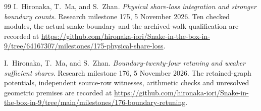 \documentclass[11pt,a4paper]{article}
\theoremstyle{definition}
\theoremstyle{remark}
\begin{document}
\begin{thebibliography}{99}
I.~Hironaka, T.~Ma, and S.~Zhan. \emph{Physical share-loss integration and stronger boundary counts}. Research milestone 175, 5 November 2026. Ten checked modules, the actual-snake boundary and the archived-walk qualification are recorded at
\url{https://github.com/hironaka-iori/Snake-in-the-box-in-9/tree/64167307/milestones/175-physical-share-loss}.

I.~Hironaka, T.~Ma, and S.~Zhan. \emph{Boundary-twenty-four retuning and weaker sufficient shares}. Research milestone 176, 5 November 2026. The retained-graph potentials, independent source-row witnesses, arithmetic checks and unresolved geometric premises are recorded at
\url{https://github.com/hironaka-iori/Snake-in-the-box-in-9/tree/main/milestones/176-boundary-retuning}.

\end{thebibliography}
\end{document}
